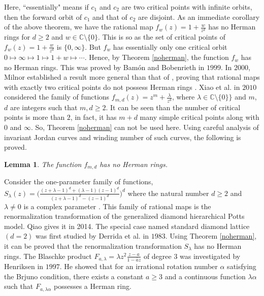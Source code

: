 \documentclass[12pt]{article}
\newtheorem{lemma}{Lemma}[section]
\begin{document}
Here, \textquotedblleft essentially" means if $c_1$ and  $c_2$ are two critical points with infinite orbits, then the forward orbit of $c_1$ and that of $c_2$ are disjoint. As an immediate corollary of the above theorem, we have the rational map $f_w(z)=1+\frac{w}{z^d}$ has no Herman rings for $d\geq 2$ and $w\in \mathbb{C}\setminus\{0\}$. This is so as the set of critical points of $f_w(z)=1+\frac{w}{z^d}$ is $\{0, \infty\}$. But $f_w$ has essentially only one critical orbit $0\mapsto \infty \mapsto 1\mapsto 1+w\mapsto \cdots $. Hence, by Theorem \ref{noherman}, the function $f_w$ has no Herman rings. This was proved by  Bam\'{o}n and Bobenrieth  \cite{bb} in $1999$. %
In $2000$, Milnor established a result more general than that of \cite{bb}, proving that rational maps with exactly two critical points do not possess Herman rings \cite{Milnor2000}.
Xiao et al. \cite{ywq} in $2010$ considered the family of functions $f_{m,d}(z)= z^m+\frac{\lambda}{z^d}$, where $\lambda\in \mathbb{C}\setminus \{0\} \}$ and $m$, $d$ are integers such that $m, d \geq 2$. It can be seen than the number of critical points is more than $2$, in fact, it has $m+d$ many simple critical points along with $0$ and $\infty$. So, Theorem \ref{noherman} can not be used here. Using careful analysis of invariant Jordan curves and winding number of such curves, the following is proved.
\begin{lemma}
\label{morecri}
	The function $f_{m,d}$ has no Herman rings.
\end{lemma}
 Consider the one-parameter family of functions,   $S_\lambda(z)=\biggl(\frac{(z+\lambda-1)^d+(\lambda-1)(z-1)^d}{(z+\lambda-1)^d-(z-1)^d}\biggr)^d$
where the natural number $d\geq 2$ and $\lambda \neq 0 $ is a complex parameter \cite{yang2017rational}. This family of rational maps is the renormalization transformation of the generalized diamond hierarchical Potts model.  Qiao gives it \cite{Qi} in 2014. The special case named standard diamond lattice $(d=2)$ was first studied by Derrida et al. \cite{DSI} in $1983$. Using Theorem \ref{noherman}, it can be proved that the renormalization transformation $S_\lambda$ has no Herman rings.
The Blaschke product  $F_{a,\lambda}=\lambda z^2 \frac{z-a}{1-\bar{a}z}$ of degree $3$ was investigated by Henriksen \cite{ch} in $1997$. He showed that for an irrational rotation number $\alpha$ satisfying the Brjuno condition,  there exists a constant $a\geq 3$ and a continuous function $\lambda{\alpha}$ such that $F_{a,\lambda\alpha}$ possesses a Herman ring.
\end{document}
